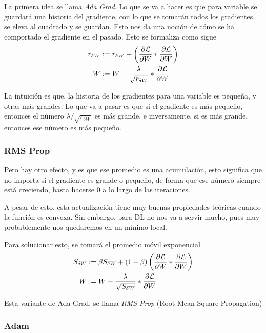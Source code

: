 La primera idea se llama \textit{Ada Grad}. Lo que se va a hacer es que para variable se guardará una historia del gradiente, con lo que se tomarán todos los gradientes, se eleva al cuadrado y se guardan. Esto nos da una noción de cómo se ha comportado el gradiente en el pasado. Esto se formaliza como sigue
\begin{align*}
    r_{\delta W} &:= r_{\delta W} + \left(\frac{\partial \mathcal{L}}{\partial W} \ast \frac{\partial \mathcal{L}}{\partial W}\right) \\
    W &:= W - \frac{\lambda}{\sqrt{r_{\delta W}}} \ast \frac{\partial \mathcal{L}}{\partial W}
\end{align*}

La intuición es que, la historia de los gradientes para una variable es pequeña, y otras más grandes. Lo que va a pasar es que si el gradiente es más pequeño, entonces el número ${\lambda}/{\sqrt{r_{\delta W}}}$ es más grande, e inversamente, si es más grande, entonces ese número es más pequeño. 

\subsubsection{RMS Prop}

Pero hay otro efecto, y es que ese promedio es una acumulación, esto significa que no importa si el gradiente es grande o pequeño, de forma que ese número siempre está creciendo, hasta hacerse 0 a lo largo de las iteraciones. 

A pesar de esto, esta actualización tiene muy buenas propiedades teóricas cuando la función es convexa. Sin embargo, para DL no nos va a servir mucho, pues muy probablemente nos quedaremos en un mínimo local.

Para solucionar esto, se tomará el promedio móvil exponencial
\begin{align*}
    S_{\delta W} &:= \beta S_{\delta W} + (1 - \beta) \left(\frac{\partial \mathcal{L}}{\partial W} \ast \frac{\partial \mathcal{L}}{\partial W}\right) \\
    W &:= W - \frac{\lambda}{\sqrt{S_{\delta W}}} \ast \frac{\partial \mathcal{L}}{\partial W}
\end{align*}

Esta variante de Ada Grad, se llama \textit{RMS Prop} (Root Mean Square Propagation)

\subsubsection{Adam}

